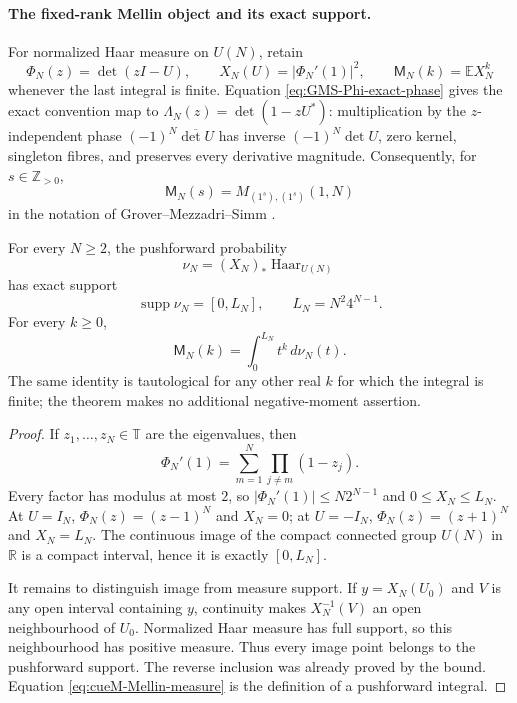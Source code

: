 \paragraph{The fixed-rank Mellin object and its exact support.}
For normalized Haar measure on $U(N)$, retain
\begin{equation}
 \Phi_N(z)=\det(zI-U),\qquad
 X_N(U)=|\Phi_N'(1)|^2,\qquad
 \mathsf M_N(k)=\mathbb E X_N^k
 \label{eq:cueM-fixedN-objects}
\end{equation}
whenever the last integral is finite.  Equation
\eqref{eq:GMS-Phi-exact-phase} gives the exact convention map to
$\Lambda_N(z)=\det(1-zU^*)$: multiplication by the $z$-independent phase
$(-1)^N\overline{\det U}$ has inverse $(-1)^N\det U$, zero kernel, singleton fibres, and
preserves every derivative magnitude.  Consequently, for $s\in\mathbb Z_{>0}$,
\begin{equation}
 \mathsf M_N(s)=M_{(1^s),(1^s)}(1,N)
 \label{eq:cueM-GMS-specialization}
\end{equation}
in the notation of Grover--Mezzadri--Simm
\cite[eq.~(1.1)]{groverMezzadriSimm2026}.

\begin{theorem}
\label{thm:cueM-fixedN-support}
For every $N\geq2$, the pushforward probability
\[
 \nu_N=(X_N)_*\operatorname{Haar}_{U(N)}
\]
has exact support
\begin{equation}
 \operatorname{supp}\nu_N=[0,L_N],\qquad L_N=N^2 4^{N-1}.
 \label{eq:cueM-exact-support}
\end{equation}
For every $k\geq0$,
\begin{equation}
 \mathsf M_N(k)=\int_0^{L_N}t^k\,d\nu_N(t).
 \label{eq:cueM-Mellin-measure}
\end{equation}
The same identity is tautological for any other real $k$ for which the integral is finite;
the theorem makes no additional negative-moment assertion.
\end{theorem}

\begin{proof}
If $z_1,\ldots,z_N\in\mathbb T$ are the eigenvalues, then
\[
 \Phi_N'(1)=\sum_{m=1}^{N}\prod_{j\ne m}(1-z_j).
\]
Every factor has modulus at most $2$, so
$|\Phi_N'(1)|\leq N2^{N-1}$ and $0\leq X_N\leq L_N$.  At $U=I_N$,
$\Phi_N(z)=(z-1)^N$ and $X_N=0$; at $U=-I_N$,
$\Phi_N(z)=(z+1)^N$ and $X_N=L_N$.  The continuous image of the compact connected group
$U(N)$ in $\mathbb R$ is a compact interval, hence it is exactly $[0,L_N]$.

It remains to distinguish image from measure support.  If $y=X_N(U_0)$ and $V$ is any open
interval containing $y$, continuity makes $X_N^{-1}(V)$ an open neighbourhood of $U_0$.
Normalized Haar measure has full support, so this neighbourhood has positive measure.
Thus every image point belongs to the pushforward support.  The reverse inclusion was already
proved by the bound.  Equation \eqref{eq:cueM-Mellin-measure} is the definition of a
pushforward integral.
\end{proof}

